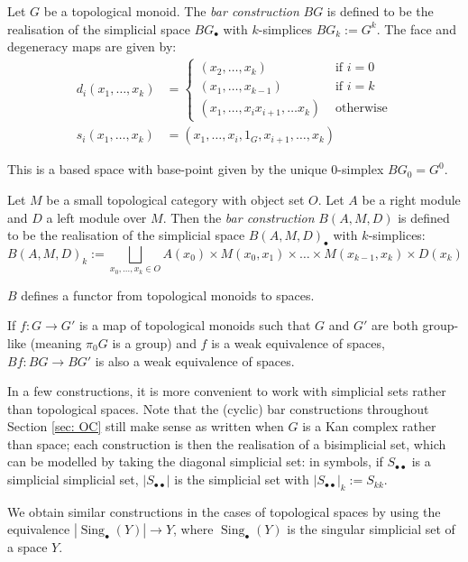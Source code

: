 \documentclass{TPmod}
\DeclareMathOperator{\Sing}{\operatorname{Sing}}
\numberwithin{equation}{section}
\begin{document}
    \begin{defn}
        Let $G$ be a topological monoid. The \emph{bar construction} $BG$ is defined to be the realisation of the simplicial space $BG_\bullet$ with $k$-simplices $BG_k := G^k$. The face and degeneracy maps are given by:
        \begin{align}
            d_i(x_1, \ldots, x_k) 
            &=
            {\begin{cases}
                (x_2, \ldots, x_k)
                & \textrm{ if } i=0\\
                (x_1, \ldots, x_{k-1})
                & \textrm{ if } i=k\\
                (x_1, \ldots, x_i x_{i+1}, \ldots x_k)
                & \textrm{ otherwise}
            \end{cases}}
            \\
            s_i(x_1, \ldots, x_k) 
            &= 
            (x_1, \ldots, x_i, 1_G, x_{i+1}, \ldots, x_k)
        \end{align}
        
        
        This is a based space with base-point given by the unique 0-simplex $BG_0=G^0$.
        
        Let $M$ be a small topological category with object set $O$. Let $A$ be a right module and $D$ a left module over $M$. Then the \emph{bar construction} $B(A,M,D)$ is defined to be the realisation of the simplicial space $B(A,M,D)_\bullet$ with $k$-simplices:
        \begin{equation}
            B(A,M,D)_k := \bigsqcup\limits_{x_0, \ldots, x_k \in O} A(x_0) \times M(x_0, x_1) \times \ldots \times M(x_{k-1}, x_k) \times D(x_k)
        \end{equation}
    \end{defn}
    \begin{lem}
        $B$ defines a functor from topological monoids to spaces.

        If $f: G \to G'$ is a map of topological monoids such that $G$ and $G'$ are both group-like (meaning $\pi_0 G$ is a group) and $f$ is a weak equivalence of spaces, $Bf: BG \to BG'$ is also a weak equivalence of spaces.
    \end{lem}
    \begin{rmk}
        In a few constructions, it is more convenient to work with simplicial sets rather than topological spaces. Note that the (cyclic) bar constructions throughout Section \ref{sec: OC} still make sense as written when $G$ is a Kan complex rather than space; each construction is then the realisation of a bisimplicial set, which can be modelled by taking the diagonal simplicial set: in symbols, if $S_{\bullet \bullet}$ is a simplicial simplicial set, $|S_{\bullet\bullet}|$ is the simplicial set with $|S_{\bullet\bullet}|_k := S_{kk}$.
        
        We obtain similar constructions in the cases of topological spaces by using the equivalence $|\Sing_\bullet(Y)| \to Y$, where $\Sing_\bullet(Y)$ is the singular simplicial set of a space $Y$.
    \end{rmk}
\end{document}
